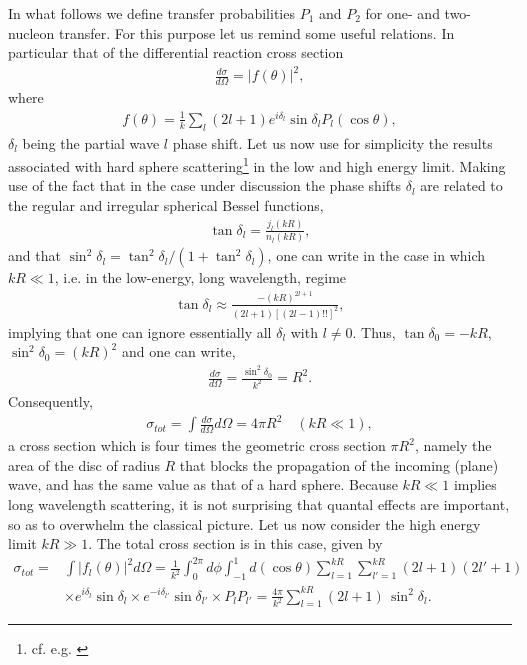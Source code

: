 In what follows we define transfer probabilities $P_{1}$ and $P_{2}$ for one- and two-nucleon transfer. For this purpose let us remind some useful relations. In particular that of the differential reaction cross section 
\begin{align}
\frac{d\sigma}{d\Omega}=|f(\theta)|^2,
\end{align}
where
\begin{align}
f(\theta)=\frac{1}{k}\sum_l(2l+1)e^{i\delta_l}\sin\delta_lP_l(\cos\theta),
\end{align}
$\delta_l$ being the partial wave $l$ phase shift. Let us now use for simplicity the results associated with hard sphere scattering\footnote{cf. e.g. \cite{Sakurai:94}} in the low and high energy limit. Making use of the fact that in the case under discussion the phase shifts $\delta_l$ are related to the regular and irregular spherical Bessel functions,
\begin{align}\label{eq3.2.8}
\tan\delta_l=\frac{j_l(kR)}{n_l(kR)},
\end{align}
and that $\sin^2\delta_l=\tan^2\delta_l/(1+\tan^2\delta_l)$,  one can write in the case in which $kR\ll1$, i.e. in the low-energy, long wavelength, regime
\begin{align}
\tan\delta_l\approx\frac{-(kR)^{2l+1}}{(2l+1)[(2l-1)!!]^2},
\end{align}
implying that one can ignore essentially all $\delta_l$ with $l\neq0$. Thus, $\tan\delta_0=-k R$, $\sin^2\delta_0=(kR)^2$ and one can write,
\begin{align}
\frac{d\sigma}{d\Omega}=\frac{\sin^2\delta_0}{k^2}=R^2.
\end{align}
Consequently,
\begin{align}
\sigma_{tot}=\int\frac{d\sigma}{d\Omega}d\Omega=4\pi R^2\quad(kR\ll1),
\end{align}
a cross section which is four times the geometric cross section $\pi R^2$, namely the area of the disc of radius $R$ that blocks the propagation of the incoming (plane) wave, and has the same value as that of a hard sphere. Because $kR\ll1$  
implies long wavelength scattering, it is not surprising that quantal effects are important, so as to overwhelm the classical picture. Let us now consider the high energy limit $kR\gg 1$. The total cross section is in this case, given by
\begin{align}\label{eq3.2.6}
\nonumber\sigma_{tot}=&\int |f_l(\theta)|^2d\Omega=\frac{1}{k^2}\int_0^{2\pi}d\phi\int_{-1}^{1}d(\cos\theta)\sum_{l=1}^{kR}\sum_{l'=1}^{kR}(2l+1)(2l'+1)\\
&\times e^{i\delta_l}\sin\delta_l\times  e^{-i\delta_{l'}}\sin\delta_{l'}\times P_lP_{l'}=\frac{4\pi}{k^2}\sum_{l=1}^{kR}(2l+1)\,\sin^2\delta_l.
\end{align}
